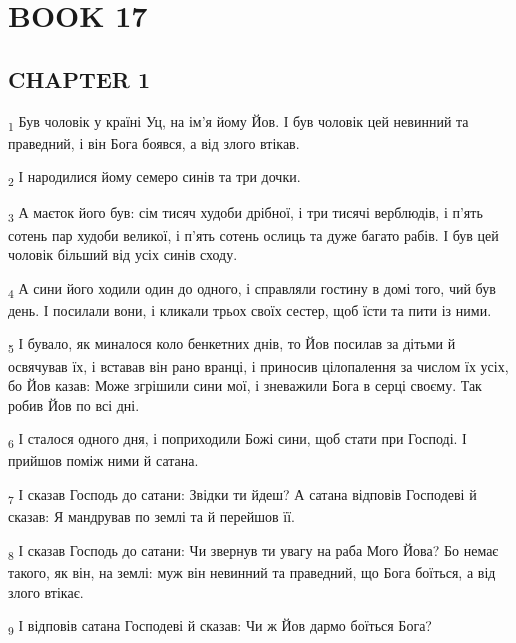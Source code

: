 \section{BOOK 17}
\subsection{CHAPTER 1}
\begin{tcolorbox}
\textsubscript{1} Був чоловік у країні Уц, на ім'я йому Йов. І був чоловік цей невинний та праведний, і він Бога боявся, а від злого втікав.
\end{tcolorbox}
\begin{tcolorbox}
\textsubscript{2} І народилися йому семеро синів та три дочки.
\end{tcolorbox}
\begin{tcolorbox}
\textsubscript{3} А маєток його був: сім тисяч худоби дрібної, і три тисячі верблюдів, і п'ять сотень пар худоби великої, і п'ять сотень ослиць та дуже багато рабів. І був цей чоловік більший від усіх синів сходу.
\end{tcolorbox}
\begin{tcolorbox}
\textsubscript{4} А сини його ходили один до одного, і справляли гостину в домі того, чий був день. І посилали вони, і кликали трьох своїх сестер, щоб їсти та пити із ними.
\end{tcolorbox}
\begin{tcolorbox}
\textsubscript{5} І бувало, як миналося коло бенкетних днів, то Йов посилав за дітьми й освячував їх, і вставав він рано вранці, і приносив цілопалення за числом їх усіх, бо Йов казав: Може згрішили сини мої, і зневажили Бога в серці своєму. Так робив Йов по всі дні.
\end{tcolorbox}
\begin{tcolorbox}
\textsubscript{6} І сталося одного дня, і поприходили Божі сини, щоб стати при Господі. І прийшов поміж ними й сатана.
\end{tcolorbox}
\begin{tcolorbox}
\textsubscript{7} І сказав Господь до сатани: Звідки ти йдеш? А сатана відповів Господеві й сказав: Я мандрував по землі та й перейшов її.
\end{tcolorbox}
\begin{tcolorbox}
\textsubscript{8} І сказав Господь до сатани: Чи звернув ти увагу на раба Мого Йова? Бо немає такого, як він, на землі: муж він невинний та праведний, що Бога боїться, а від злого втікає.
\end{tcolorbox}
\begin{tcolorbox}
\textsubscript{9} І відповів сатана Господеві й сказав: Чи ж Йов дармо боїться Бога?
\end{tcolorbox}
